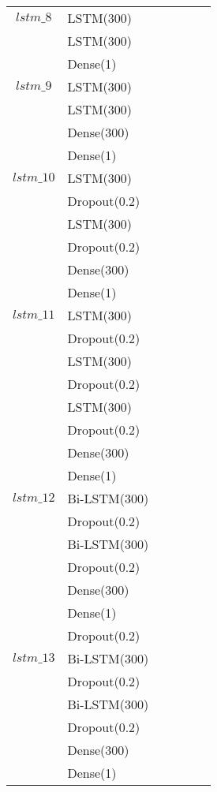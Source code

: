 \begin{longtable}{| c | m{0.58\linewidth} | r | m{0.1\linewidth} |}

    $lstm\_8$   & LSTM(300)                 \\
                & LSTM(300)                 \\
                & Dense(1)                  \\ \hline

    $lstm\_9$   & LSTM(300)                 \\
                & LSTM(300)                 \\
                & Dense(300)                \\
                & Dense(1)                  \\ \hline

    $lstm\_10$  & LSTM(300)                 \\
                & Dropout(0.2)              \\
                & LSTM(300)                 \\
                & Dropout(0.2)              \\
                & Dense(300)                \\
                & Dense(1)                  \\ \hline
    $lstm\_11$  & LSTM(300)                 \\
                & Dropout(0.2)              \\
                & LSTM(300)                 \\
                & Dropout(0.2)              \\
                & LSTM(300)                 \\
                & Dropout(0.2)              \\
                & Dense(300)                \\
                & Dense(1)                  \\ \hline
    $lstm\_12$  & Bi-LSTM(300)              \\
                & Dropout(0.2)              \\
                & Bi-LSTM(300)              \\
                & Dropout(0.2)              \\
                & Dense(300)                \\
                & Dense(1)                  \\ \hline
                & Dropout(0.2)              \\
    $lstm\_13$  & Bi-LSTM(300)              \\
                & Dropout(0.2)              \\
                & Bi-LSTM(300)              \\
                & Dropout(0.2)              \\
                & Dense(300)                \\
                & Dense(1)                  \\ \hline


\end{longtable}
